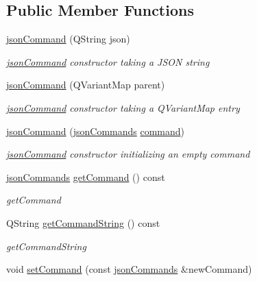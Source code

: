 \subsection*{Public Member Functions}
\begin{DoxyCompactItemize}
\item 
\hyperlink{class_k4_u_1_1json_command_abe7de86a0eda411ce7099c93f1c44910}{json\-Command} (Q\-String json)
\begin{DoxyCompactList}\small\item\em \hyperlink{class_k4_u_1_1json_command}{json\-Command} constructor taking a J\-S\-O\-N string \end{DoxyCompactList}\item 
\hyperlink{class_k4_u_1_1json_command_af168a08b5a37459cfd5564d648b49a78}{json\-Command} (Q\-Variant\-Map parent)
\begin{DoxyCompactList}\small\item\em \hyperlink{class_k4_u_1_1json_command}{json\-Command} constructor taking a Q\-Variant\-Map entry \end{DoxyCompactList}\item 
\hyperlink{class_k4_u_1_1json_command_ae101f9ad219e455b8868b3d13ea6c251}{json\-Command} (\hyperlink{namespace_k4_u_a7edfadcc446c5a68af90f9aec6abd75e}{json\-Commands} \hyperlink{class_k4_u_1_1json_command_ab78518e19fe664d54b9c4743a3521b04}{command})
\begin{DoxyCompactList}\small\item\em \hyperlink{class_k4_u_1_1json_command}{json\-Command} constructor initializing an empty command \end{DoxyCompactList}\item 
\hyperlink{namespace_k4_u_a7edfadcc446c5a68af90f9aec6abd75e}{json\-Commands} \hyperlink{class_k4_u_1_1json_command_a2db6f8da6bc5a4c677201f044b69bb10}{get\-Command} () const 
\begin{DoxyCompactList}\small\item\em get\-Command \end{DoxyCompactList}\item 
Q\-String \hyperlink{class_k4_u_1_1json_command_ac6bc0d606265f47db9bae5a6a40cb244}{get\-Command\-String} () const 
\begin{DoxyCompactList}\small\item\em get\-Command\-String \end{DoxyCompactList}\item 
void \hyperlink{class_k4_u_1_1json_command_a50c17e574aae380cd21d76029fcd07b6}{set\-Command} (const \hyperlink{namespace_k4_u_a7edfadcc446c5a68af90f9aec6abd75e}{json\-Commands} \&new\-Command)

\end{DoxyCompactItemize}
